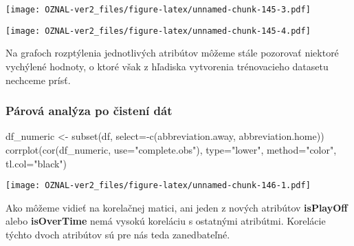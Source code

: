 \documentclass[
]{article}
\newenvironment{Shaded}{\begin{snugshade}}{\end{snugshade}}
\newcommand{\AttributeTok}[1]{\textcolor[rgb]{0.77,0.63,0.00}{#1}}
\newcommand{\ConstantTok}[1]{\textcolor[rgb]{0.00,0.00,0.00}{#1}}
\newcommand{\DecValTok}[1]{\textcolor[rgb]{0.00,0.00,0.81}{#1}}
\newcommand{\FloatTok}[1]{\textcolor[rgb]{0.00,0.00,0.81}{#1}}
\newcommand{\FunctionTok}[1]{\textcolor[rgb]{0.00,0.00,0.00}{#1}}
\newcommand{\NormalTok}[1]{#1}
\newcommand{\OtherTok}[1]{\textcolor[rgb]{0.56,0.35,0.01}{#1}}
\newcommand{\SpecialCharTok}[1]{\textcolor[rgb]{0.00,0.00,0.00}{#1}}
\newcommand{\StringTok}[1]{\textcolor[rgb]{0.31,0.60,0.02}{#1}}
\begin{document}
\texttt{[image: OZNAL-ver2\_files/figure-latex/unnamed-chunk-145-3.pdf]}

\begin{Shaded}
\end{Shaded}

\texttt{[image: OZNAL-ver2\_files/figure-latex/unnamed-chunk-145-4.pdf]}

Na grafoch rozptýlenia jednotlivých atribútov môžeme stále pozorovať
niektoré vychýlené hodnoty, o ktoré však z hľadiska vytvorenia
trénovacieho datasetu nechceme prísť.

\hypertarget{puxe1rovuxe1-analuxfdza-po-ux10distenuxed-duxe1t}{%
\subsubsection{Párová analýza po čistení
dát}\label{puxe1rovuxe1-analuxfdza-po-ux10distenuxed-duxe1t}}

\begin{Shaded}
\begin{Highlighting}[]
\NormalTok{df\_numeric }\OtherTok{\textless{}{-}} \FunctionTok{subset}\NormalTok{(df, }\AttributeTok{select=}\SpecialCharTok{{-}}\FunctionTok{c}\NormalTok{(abbreviation.away, abbreviation.home))}
\FunctionTok{corrplot}\NormalTok{(}\FunctionTok{cor}\NormalTok{(df\_numeric, }\AttributeTok{use=}\StringTok{"complete.obs"}\NormalTok{), }\AttributeTok{type=}\StringTok{"lower"}\NormalTok{, }\AttributeTok{method=}\StringTok{"color"}\NormalTok{, }\AttributeTok{tl.col=}\StringTok{"black"}\NormalTok{)}
\end{Highlighting}
\end{Shaded}

\texttt{[image: OZNAL-ver2\_files/figure-latex/unnamed-chunk-146-1.pdf]}

Ako môžeme vidieť na korelačnej matici, ani jeden z nových atribútov
\textbf{isPlayOff} alebo \textbf{isOverTime} nemá vysokú koreláciu s
ostatnými atribútmi. Korelácie týchto dvoch atribútov sú pre nás teda
zanedbateľné.
\end{document}

